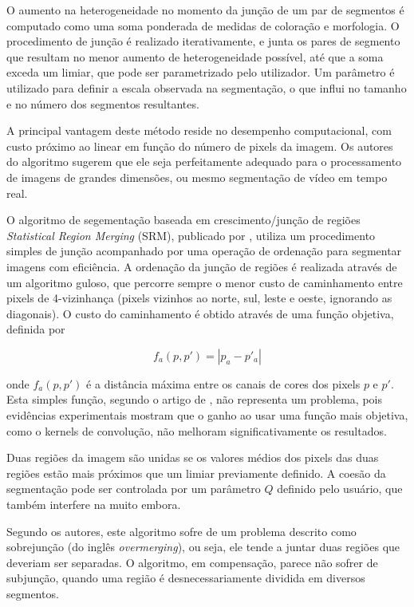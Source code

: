 O aumento na heterogeneidade no momento da junção de um par de segmentos é computado como uma soma ponderada de medidas de coloração e morfologia. O procedimento de junção é realizado iterativamente, e  junta os pares de segmento que resultam no menor aumento de heterogeneidade possível, até que a soma exceda um limiar, que pode ser parametrizado pelo utilizador. Um parâmetro é utilizado para definir a escala observada na segmentação, o que influi no tamanho e no número dos segmentos resultantes.

A principal vantagem deste método reside no desempenho computacional, com custo próximo ao linear em função do número de pixels da imagem. Os autores do algoritmo sugerem que ele seja perfeitamente adequado para o processamento de imagens de grandes dimensões, ou mesmo segmentação de vídeo em tempo real.


O algoritmo de segementação baseada em crescimento/junção de regiões \textit{Statistical Region Merging} (SRM), publicado por , utiliza um procedimento simples de junção acompanhado por uma operação de ordenação para segmentar imagens com eficiência. A ordenação da junção de regiões é realizada através de um algoritmo guloso, que percorre sempre o menor custo de caminhamento entre pixels de 4-vizinhança (pixels vizinhos ao norte, sul, leste e oeste, ignorando as diagonais). O custo do caminhamento é obtido através de uma função objetiva, definida por

\begin{equation}
	\displaystyle f_a(p, p') = |p_a - p'_a|
\end{equation}

onde $f_a(p, p')$ é a distância máxima entre os canais de cores dos pixels $p$ e $p'$. Esta simples função, segundo o artigo de , não representa um problema, pois evidências experimentais mostram que o ganho ao usar uma função mais objetiva, como o kernels de convolução, não melhoram significativamente os resultados.

Duas regiões da imagem são unidas se os valores médios dos pixels das duas regiões estão mais próximos que um limiar previamente definido. A coesão da segmentação pode ser controlada por um parâmetro $Q$ definido pelo usuário, que também interfere na muito embora.

Segundo os autores, este algoritmo sofre de um problema descrito como sobrejunção (do inglês \textit{overmerging}), ou seja, ele tende a juntar duas regiões que deveriam ser separadas. O algoritmo, em compensação, parece não sofrer de subjunção, quando uma região é desnecessariamente dividida em diversos segmentos.

